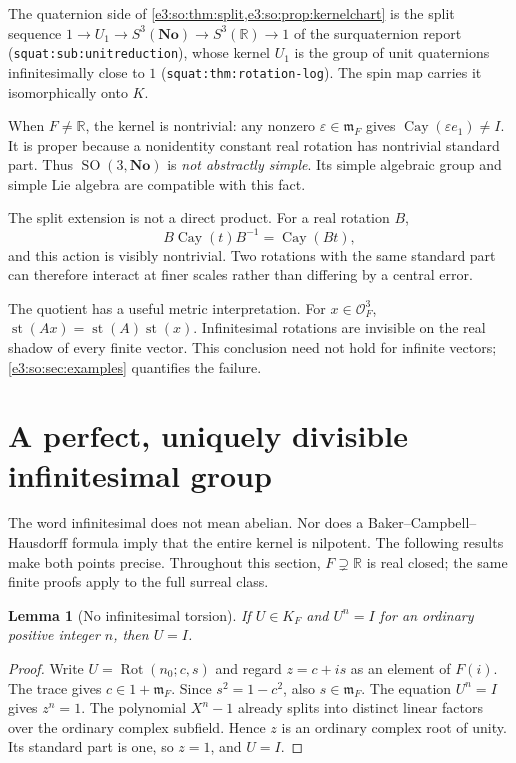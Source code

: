 \documentclass[11pt,letterpaper]{article}
\numberwithin{equation}{section}
\newtheorem{lemma}[lemma]{Lemma}
\theoremstyle{definition}
\theoremstyle{remark}
\newcommand{\No}{\mathbf{No}}
\newcommand{\R}{\mathbb R}
\newcommand{\OO}{\mathcal O}
\newcommand{\mm}{\mathfrak m}
\newcommand{\eps}{\varepsilon}
\newcommand{\st}{\operatorname{st}}
\newcommand{\SO}{\operatorname{SO}}
\newcommand{\cay}{\operatorname{Cay}}
\newcommand{\Rot}{\operatorname{Rot}}
\begin{document}
The quaternion side of \cref{e3:so:thm:split,e3:so:prop:kernelchart} is the
split sequence \(1\to U_1\to S^3(\No)\to S^3(\R)\to1\) of the surquaternion
report (\texttt{squat:sub:unitreduction}), whose kernel \(U_1\) is the group of
unit quaternions infinitesimally close to \(1\)
(\texttt{squat:thm:rotation-log}). The spin map carries it isomorphically onto
\(K\).

When \(F\ne\R\), the kernel is nontrivial: any nonzero
\(\eps\in\mm_F\) gives \(\cay(\eps e_1)\ne I\). It is proper because a
nonidentity constant real rotation has nontrivial standard part. Thus
\(\SO(3,\No)\) is \emph{not abstractly simple}. Its simple algebraic group and
simple Lie algebra are compatible with this fact.

The split extension is not a direct product. For a real rotation \(B\),
\begin{equation}\label{e3:so:eq:conjcay}
 B\cay(t)B^{-1}=\cay(Bt),
\end{equation}
and this action is visibly nontrivial. Two rotations with the same standard
part can therefore interact at finer scales rather than differing by a central
error.

The quotient has a useful metric interpretation. For \(x\in\OO_F^3\),
\(\st(Ax)=\st(A)\st(x)\). Infinitesimal rotations are invisible on the real
shadow of every finite vector. This conclusion need not hold for infinite
vectors; \cref{e3:so:sec:examples} quantifies the failure.

\section{A perfect, uniquely divisible infinitesimal group}\label{e3:so:sec:perfect}

The word infinitesimal does not mean abelian. Nor does a Baker--Campbell--Hausdorff
formula imply that the entire kernel is nilpotent. The following results make
both points precise. Throughout this section, \(F\supsetneq\R\) is real closed;
the same finite proofs apply to the full surreal class.

\begin{lemma}[No infinitesimal torsion]\label{e3:so:lem:torsion}
If \(U\in K_F\) and \(U^n=I\) for an ordinary positive integer \(n\), then
\(U=I\).
\end{lemma}
\begin{proof}
Write \(U=\Rot(n_0;c,s)\) and regard \(z=c+is\) as an element of \(F(i)\).
The trace gives \(c\in1+\mm_F\). Since \(s^2=1-c^2\), also \(s\in\mm_F\).
The equation \(U^n=I\) gives \(z^n=1\). The polynomial \(X^n-1\) already
splits into distinct linear factors over the ordinary complex subfield.
Hence \(z\) is an ordinary complex root of unity. Its standard part is one,
so \(z=1\), and \(U=I\).
\end{proof}
\end{document}
